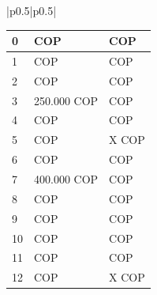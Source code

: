 \begin{center}
\begin{longtable}[H]{|p{0.5\linewidth}|p{0.5\linewidth}|}
{\begin{center}
\begin{tabular}{|p{4cm}|p{4cm}|p{4cm}|}
    0                &  COP                      &  COP                          \\ \hline
    1                &  COP                      &  COP                          \\ \hline
    2                &  COP                      &  COP                          \\ \hline
    3                &  250.000 COP              &  COP                          \\ \hline
    4                &  COP                      &  COP                          \\ \hline
    5                &  COP                      &  X COP                        \\ \hline
    6                &  COP                      &  COP                          \\ \hline
    7                &  400.000 COP              &  COP                          \\ \hline
    8                &  COP                      &  COP                          \\ \hline
    9                &  COP                      &  COP                          \\ \hline
    10               &  COP                      &  COP                          \\ \hline
    11               &  COP                      &  COP                          \\ \hline
    12               &  COP                      &  X COP                        \\ \hline
   \end{tabular}
  \end{center}
  }                                                                                                           \\ \hline
                                 \\ \hline
                                                               \\
                        \\ \hline
                                 \\ \hline

\end{longtable}
\end{center}
